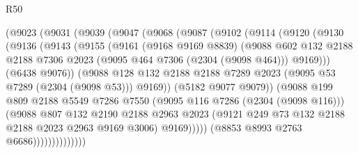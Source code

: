\begin{lexlean}{R50}
\begin{coremodule}
                  (@9023
                    (@9031
                      (@9039
                        (@9047
                          (@9068
                            (@9087
                              (@9102
                                (@9114
                                  (@9120
                                    (@9130
                                      (@9136
                                        (@9143
                                          (@9155
                                            (@9161
                                              (@9168 @9169 @8839)
                                              (@9088
                                                @602
                                                @132
                                                @2188
                                                @2188
                                                @7306
                                                @2023
                                                (@9095 @464 @7306 (@2304 (@9098 @464)))
                                                @9169)))
                                          (@6438 @9076))
                                        (@9088
                                          @128
                                          @132
                                          @2188
                                          @2188
                                          @7289
                                          @2023
                                          (@9095 @53 @7289 (@2304 (@9098 @53)))
                                          @9169))
                                      (@5182 @9077 @9079))
                                    (@9088
                                      @199
                                      @809
                                      @2188
                                      @5549
                                      @7286
                                      @7550
                                      (@9095 @116 @7286 (@2304 (@9098 @116)))
                                      (@9088
                                        @807
                                        @132
                                        @2190
                                        @2188
                                        @2963
                                        @2023
                                        (@9121 @249 @73 @132 @2188 @2188 @2023 @2963 @9169 @3006)
                                        @9169)))))
                              (@8853 @8993 @2763 @6686))))))))))))))

\end{coremodule}
\end{lexlean}
